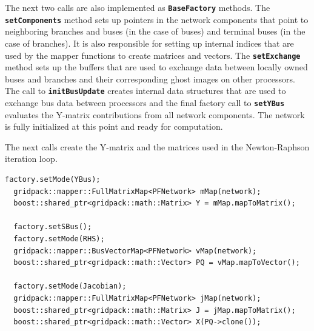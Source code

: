 The next two calls are also implemented as \texttt{\textbf{BaseFactory}} methods. The \texttt{\textbf{setComponents}} method sets up pointers in the network components that point to neighboring branches and buses (in the case of buses) and terminal buses (in the case of branches). It is also responsible for setting up internal indices that are used by the mapper functions to create matrices and vectors. The \texttt{\textbf{setExchange}} method sets up the buffers that are used to exchange data between locally owned buses and branches and their corresponding ghost images on other processors. The call to \texttt{\textbf{initBusUpdate}} creates internal data structures that are used to exchange bus data between processors and the final factory call to \texttt{\textbf{setYBus}} evaluates the Y-matrix contributions from all network components. The network is fully initialized at this point and ready for computation.

The next calls create the Y-matrix and the matrices used in the Newton-Raphson iteration loop.

{
\color{red}
\begin{Verbatim}[fontseries=b]
  factory.setMode(YBus);
  gridpack::mapper::FullMatrixMap<PFNetwork> mMap(network);
  boost::shared_ptr<gridpack::math::Matrix> Y = mMap.mapToMatrix();

  factory.setSBus();
  factory.setMode(RHS);
  gridpack::mapper::BusVectorMap<PFNetwork> vMap(network);
  boost::shared_ptr<gridpack::math::Vector> PQ = vMap.mapToVector();

  factory.setMode(Jacobian);
  gridpack::mapper::FullMatrixMap<PFNetwork> jMap(network);
  boost::shared_ptr<gridpack::math::Matrix> J = jMap.mapToMatrix();
  boost::shared_ptr<gridpack::math::Vector> X(PQ->clone());
\end{Verbatim}
}

